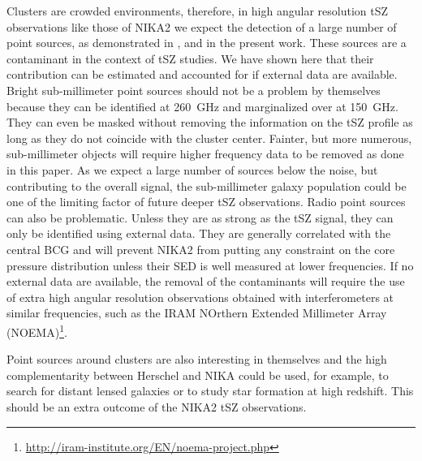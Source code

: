\documentclass[twocolumn,traditabstract]{aa}
\begin{document}
Clusters are crowded environments, therefore, in high angular resolution tSZ observations like those of NIKA2 we expect the detection of a large number of point sources, as demonstrated in \cite{adam2013}, \cite{adam2014} and in the present work. These sources are a contaminant in the context of tSZ studies. We have shown here that their contribution can be estimated and accounted for if external data are available. Bright sub-millimeter point sources should not be a problem by themselves because they can be identified at 260~GHz and marginalized over at 150~GHz. They can even be masked without removing the information on the tSZ profile as long as they do not coincide with the cluster center. Fainter, but more numerous, sub-millimeter objects will require higher frequency data to be removed as done in this paper. As we expect a large number of sources below the noise, but contributing to the overall signal, the sub-millimeter galaxy population could be one of the limiting factor of future deeper tSZ observations. Radio point sources can also be problematic. Unless they are as strong as the tSZ signal, they can only be identified using external data. They are generally correlated with the central BCG and will prevent NIKA2 from putting any constraint on the core pressure distribution unless their SED is well measured at lower frequencies. If no external data are available, the removal of the contaminants will require the use of extra high angular resolution observations obtained with interferometers at similar frequencies, such as the IRAM NOrthern Extended Millimeter Array (NOEMA)\footnote{\url{http://iram-institute.org/EN/noema-project.php}}. 

Point sources around clusters are also interesting in themselves and the high complementarity between Herschel and NIKA could be used, for example, to search for distant lensed galaxies \citep[see for example][]{egami2010} or to study star formation at high redshift. This should be an extra outcome of the NIKA2 tSZ observations.
\end{document}
